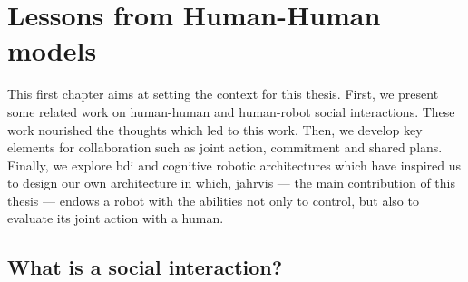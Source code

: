 \documentclass[a4paper,11pt,twoside]{StyleThese}
\begin{document}
	\setcounter{chapter}{0} %
	\dominitoc
	\faketableofcontents
	\fi


\chapter{Lessons from Human-Human models}
\label{chapter:chap1}
\minitoc

This first chapter aims at setting the context for this thesis. First, we present some related work on human-human and human-robot social interactions. These work nourished the thoughts which led to this work. Then, we develop key elements for collaboration such as joint action, commitment and shared plans. Finally, we explore \acrfull{bdi} and cognitive robotic architectures  which have inspired us to design our own architecture in which, \acrshort{jahrvis} —  the main contribution of this thesis — endows a robot with the abilities not only to control, but also to evaluate its joint action with a human. 


\section{What is a social interaction?}
\label{chap1:sec:soc_int}
\end{document}
